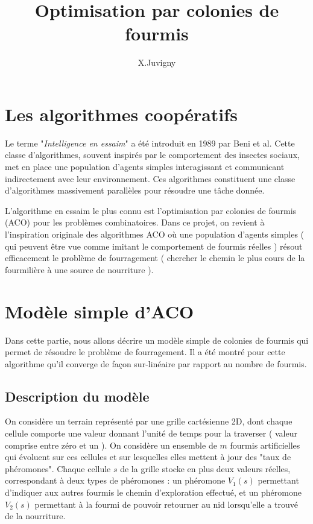 \documentclass[a4]{article}
\title{Optimisation par colonies de fourmis}
\author{X.Juvigny}
\begin{document}
\maketitle

\section{Les algorithmes coopératifs}

Le terme "\textsl{Intelligence en essaim}" a été introduit en 1989 par Beni et al. Cette classe d'algorithmes, souvent inspirés par le comportement des insectes sociaux, met en place une population d'agents simples interagissant et communicant indirectement avec leur
environnement. Ces algorithmes constituent une classe d'algorithmes massivement parallèles pour résoudre une tâche donnée.

L'algorithme en essaim le plus connu est l'optimisation par colonies de fourmis (ACO) pour les problèmes combinatoires. Dans ce projet,
on revient à l'inspiration originale des algorithmes ACO où une population d'agents simples ( qui peuvent être vue comme imitant le
comportement de fourmis réelles ) résout efficacement le problème de fourragement ( chercher le chemin le plus cours de la fourmilière
à une source de nourriture ).

\section{Modèle simple d'ACO}
Dans cette partie, nous allons décrire un modèle simple de colonies de fourmis qui permet de résoudre le problème de fourragement.
Il a été montré pour cette algorithme qu'il converge de façon sur-linéaire par rapport au nombre de fourmis.

\subsection{Description du modèle}

On considère un terrain représenté par une grille cartésienne 2D, dont chaque cellule comporte une valeur donnant l'unité de temps pour
la traverser ( valeur comprise entre zéro et un ). 
On considère un ensemble de $m$ fourmis artificielles qui évoluent sur ces cellules et sur lesquelles elles mettent à jour des "taux de
phéromones". Chaque cellule $s$ de la grille stocke en plus deux valeurs réelles, correspondant à deux types de phéromones : un phéromone
$V_{1}(s)$ permettant d'indiquer aux autres fourmis le chemin d'exploration effectué, et un phéromone $V_{2}(s)$ permettant à la fourmi
de pouvoir retourner au nid lorsqu'elle a trouvé de la nourriture. 
\end{document}
